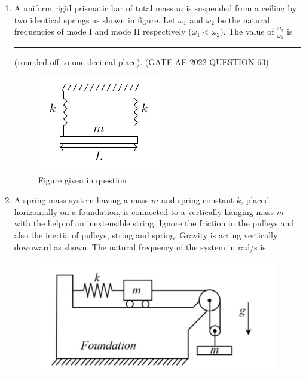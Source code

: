 \begin{enumerate}[label=\thechapter.\arabic*,ref=\thechapter.\theenumi]
\item A uniform rigid prismatic bar of total mass $ m$ is suspended from a ceiling by two
identical springs as shown in figure.
Let $ \omega_1$ and $ \omega_2$ be the natural frequencies of mode I and mode II respectively
($ \omega_1 < \omega_2$).
The value of $ \frac{\omega_2}{\omega_1}$ is \rule{1cm}{0.15mm} (rounded off to one decimal place).
\hfill(GATE AE 2022 QUESTION 63)\\
\begin{figure}[h!]
    \includegraphics[width = \columnwidth]{2022/AE/63/figs/qn_fig.pdf}
    \caption{Figure given in question }
    \centering
    \label{fig: nm_63_fig_1}
\end{figure}
\solution

\newpage
\item A spring-mass system having a mass $m$ and spring constant $k$, placed horizontally on a foundation, is connected to a vertically hanging mass $m$ with the help of an inextensible string. Ignore the friction in the pulleys and also the inertia of pulleys, string and spring. Gravity is acting vertically downward as shown. The natural frequency of the system in rad/s is 
\begin{figure}[htbp]
	\includegraphics[width=\columnwidth]{2022/XE/76/figs/question_xe76_22.jpg}

\end{figure}
\end{enumerate}
